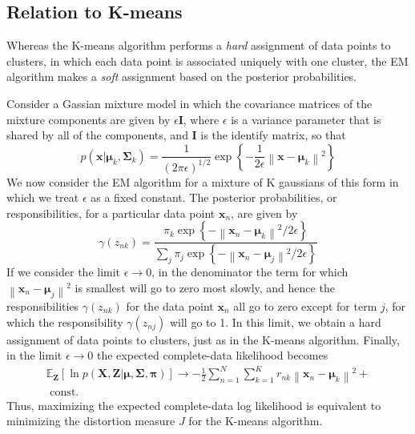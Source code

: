 \documentclass[5p,sort&compress]{elsarticle}
\begin{document}
\subsection{Relation to K-means}

Whereas the K-means algorithm performs a \textit{hard} assignment of data points to clusters, in which each data point is associated uniquely with one cluster, the EM algorithm makes a \textit{soft} assignment based on the posterior probabilities.

Consider a Gassian mixture model in which the covariance matrices of the mixture components are given by $\epsilon\mathbf{I}$, where $\epsilon$ is a variance parameter that is shared by all of the components, and $\mathbf{I}$ is the identify matrix, so that
\begin{equation}
p\left(\mathbf{x} | \boldsymbol{\mu}_{k}, \mathbf{\Sigma}_{k}\right)=\frac{1}{(2 \pi \epsilon)^{1 / 2}} \exp \left\{-\frac{1}{2 \epsilon}\left\|\mathbf{x}-\boldsymbol{\mu}_{k}\right\|^{2}\right\}
\end{equation}
We now consider the EM algorithm for a mixture of K gaussians of this form in which we treat $\epsilon$ as a fixed constant. The posterior probabilities, or responsibilities, for a particular data point $\mathbf{x}_n$, are given by
\begin{equation}
\gamma\left(z_{n k}\right)=\frac{\pi_{k} \exp \left\{-\left\|\mathbf{x}_{n}-\boldsymbol{\mu}_{k}\right\|^{2} / 2 \epsilon\right\}}{\sum_{j} \pi_{j} \exp \left\{-\left\|\mathbf{x}_{n}-\boldsymbol{\mu}_{j}\right\|^{2} / 2 \epsilon\right\}}
\end{equation}
If we consider the limit $\epsilon \rightarrow 0$, in the denominator the term for which $\left\|\mathbf{x}_{n}-\boldsymbol{\mu}_{j}\right\|^{2}$ is smallest will go to zero most slowly, and hence the responsibilities $\gamma\left(z_{n k}\right)$ for the data point $\mathbf{x}_n$ all go to zero except for term $j$, for which the responsibility $\gamma\left(z_{n j}\right)$ will go to 1. In this limit, we obtain a hard assignment of data points to clusters, just as in the K-means algorithm. Finally, in the limit $\epsilon \rightarrow 0$ the expected complete-data likelihood becomes
\begin{equation}
\begin{aligned}
\mathbb{E}_{\mathbf{Z}}[\ln p(\mathbf{X}, \mathbf{Z} | \boldsymbol{\mu}, \boldsymbol{\Sigma}, \boldsymbol{\pi})] \rightarrow-\frac{1}{2} \sum_{n=1}^{N} \sum_{k=1}^{K} r_{n k}\left\|\mathbf{x}_{n}-\boldsymbol{\mu}_{k}\right\|^{2}+ \\
\text { const. }
\end{aligned}
\end{equation}
Thus, maximizing the expected complete-data log likelihood is equivalent to minimizing the distortion measure $J$ for the K-means algorithm.
\end{document}
